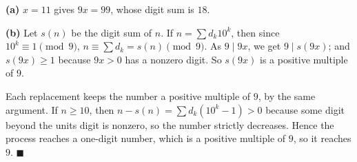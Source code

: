 \textbf{(a)} $x=11$ gives $9x=99$, whose digit sum is $18$.

\textbf{(b)} Let $s(n)$ be the digit sum of $n$. If $n=\sum d_k10^k$, then since $10^k\equiv1\pmod9$, $n\equiv\sum d_k=s(n)\pmod9$. As $9\mid9x$, we get $9\mid s(9x)$; and $s(9x)\ge1$ because $9x>0$ has a nonzero digit. So $s(9x)$ is a positive multiple of $9$.

Each replacement keeps the number a positive multiple of $9$, by the same argument. If $n\ge10$, then $n-s(n)=\sum d_k\left(10^k-1\right)>0$ because some digit beyond the units digit is nonzero, so the number strictly decreases. Hence the process reaches a one-digit number, which is a positive multiple of $9$, so it reaches $\boxed{9}$. $\blacksquare$
